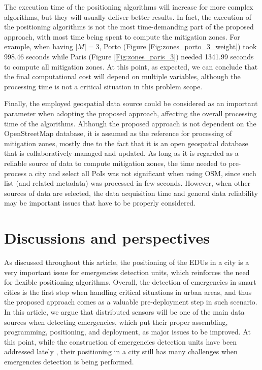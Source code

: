 \begin{refsection}
The execution time of the positioning algorithms will increase for more complex algorithms, but they will usually deliver better results. In fact, the execution of the positioning algorithms is not the most time-demanding part of the proposed approach, with most time being spent to compute the mitigation zones. For example, when having $|M|=3$, Porto (Figure \ref{Fig:zones_porto_3_weight}) took 998.46 seconds while Paris (Figure \ref{Fig:zones_paris_3}) needed 1341.99 seconds to compute all mitigation zones. At this point, as expected, we can conclude that the final computational cost will depend on multiple variables, although the processing time is not a critical situation in this problem scope.

Finally, the employed geospatial data source could be considered as an important parameter when adopting the proposed approach, affecting the overall processing time of the algorithms. Although the proposed approach is not dependent on the OpenStreetMap database, it is assumed as the reference for processing of mitigation zones, mostly due to the fact that it is an open geospatial database that is collaboratively managed and updated. As long as it is regarded as a reliable source of data to compute mitigation zones, the time needed to pre-process a city and select all PoIs was not significant when using OSM, since such list (and related metadata) was processed in few seconds. However, when other sources of data are selected, the data acquisition time and general data reliability may be important issues that have to be properly considered.

\section{Discussions and perspectives}\label{S:6}

As discussed throughout this article, the positioning of the EDUs in a city is a very important issue for emergencies detection units, which reinforces the need for flexible positioning algorithms. Overall, the detection of emergencies in smart cities is the first step when handling critical situations in urban areas, and thus the proposed approach comes as a valuable pre-deployment step in such scenario. In this article, we argue that distributed sensors will be one of the main data sources when detecting emergencies, which put their proper assembling, programming, positioning, and deployment, as major issues to be improved. At this point, while the construction of emergencies detection units have been addressed lately \cite{hardware1,hardware2}, their positioning in a city still has many challenges when emergencies detection is being performed.


\end{refsection}
